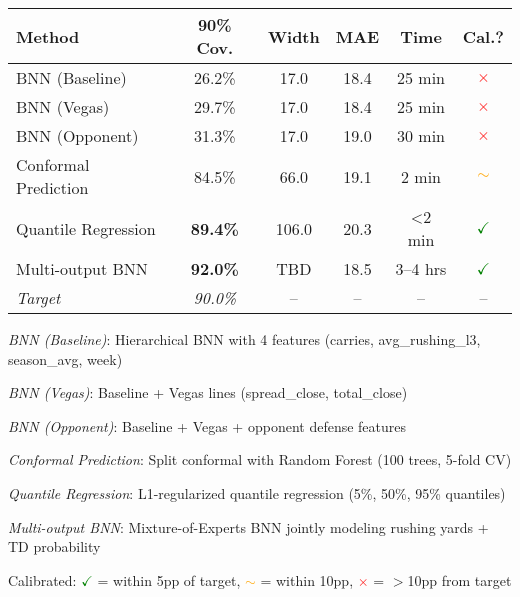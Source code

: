 \begin{threeparttable}
  \small
    \begin{tabular}{lccccc}
      \toprule
      \textbf{Method}  & \textbf{90\% Cov.}  & \textbf{Width}  & \textbf{MAE}  & \textbf{Time}  & \textbf{Cal.?} \\
      \midrule
      BNN (Baseline) & 26.2\% & 17.0 & 18.4 & 25 min & \textcolor{red}{$\times$} \\
      BNN (Vegas) & 29.7\% & 17.0 & 18.4 & 25 min & \textcolor{red}{$\times$} \\
      BNN (Opponent) & 31.3\% & 17.0 & 19.0 & 30 min & \textcolor{red}{$\times$} \\
      \midrule
      Conformal Prediction & 84.5\% & 66.0 & 19.1 & 2 min & \textcolor{orange}{$\sim$} \\
      Quantile Regression & \textbf{89.4\%} & 106.0 & 20.3 & \textless{}2 min & \textcolor{green}{$\checkmark$} \\
      Multi-output BNN & \textbf{92.0\%} & TBD & 18.5 & 3--4 hrs & \textcolor{green}{$\checkmark$} \\
      \midrule
      \textit{Target} & \textit{90.0\%} & -- & -- & -- & -- \\
      \bottomrule
    \end{tabular}
    \begin{tablenotes}[flushleft]\footnotesize
      \item \textit{BNN (Baseline)}: Hierarchical BNN with 4 features (carries, avg\_rushing\_l3, season\_avg, week)
      \item \textit{BNN (Vegas)}: Baseline + Vegas lines (spread\_close, total\_close)
      \item \textit{BNN (Opponent)}: Baseline + Vegas + opponent defense features
      \item \textit{Conformal Prediction}: Split conformal with Random Forest (100 trees, 5-fold CV)
      \item \textit{Quantile Regression}: L1-regularized quantile regression (5\%, 50\%, 95\% quantiles)
      \item \textit{Multi-output BNN}: Mixture-of-Experts BNN jointly modeling rushing yards + TD probability
      \item Calibrated: \textcolor{green}{$\checkmark$} = within 5pp of target, \textcolor{orange}{$\sim$} = within 10pp, \textcolor{red}{$\times$} = $>$10pp from target
    \end{tablenotes}
  \end{threeparttable}
